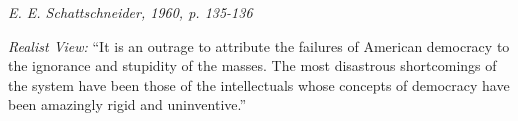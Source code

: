 \documentclass[12pt]{article}
\begin{document}
\hfill 

\textit{E. E. Schattschneider, 1960, p. 135-136}

\textit{Realist View:} ``It is an outrage to attribute the failures of American democracy to the ignorance and stupidity of the masses. The most disastrous shortcomings of the system have been those of the intellectuals whose concepts of democracy have been amazingly rigid and uninventive.'' 


\clearpage  %
\printindex %
\end{document}
